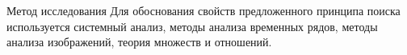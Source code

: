 \documentclass{.local/lib/classes/ndvr-super-article-standalone}
\begin{document}
    \begin{description-item}{Метод исследования}
        Для обоснования свойств предложенного принципа 
        поиска используется системный анализ, 
        методы анализа временных рядов, 
        методы анализа изображений, 
        теория множеств и отношений.
    \end{description-item}
\end{document}
